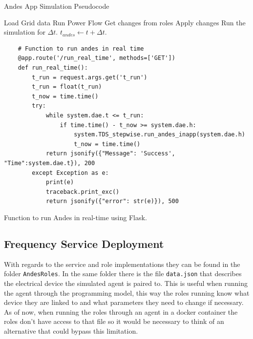 \documentclass{article}
\begin{document}
\begin{algorithm}
    \caption{Andes App Simulation Pseudocode}
    \begin{algorithmic}[1]
        \State Load Grid data
        \State Run Power Flow 
            \State Get changes from roles
            \State Apply changes
            \State Run the simulation for $\Delta t$.
            \State $t_{andes} \gets t + \Delta t$.
        \EndWhile
    \end{algorithmic}
\end{algorithm}

\begin{listing}[H]
    \begin{verbatim}
    # Function to run andes in real time
    @app.route('/run_real_time', methods=['GET'])
    def run_real_time():
        t_run = request.args.get('t_run')
        t_run = float(t_run)
        t_now = time.time()
        try:
            while system.dae.t <= t_run:
                if time.time() - t_now >= system.dae.h: 
                    system.TDS_stepwise.run_andes_inapp(system.dae.h)
                    t_now = time.time()
            return jsonify({"Message": 'Success', "Time":system.dae.t}), 200
        except Exception as e:
            print(e)
            traceback.print_exc()
            return jsonify({"error": str(e)}), 500
    \end{verbatim}
    \caption{Function to run Andes in real-time using Flask.}
    \label{code:andes_real_time}
    \end{listing}

\subsection{Frequency Service Deployment}

With regards to the service and role implementations they can be found in the folder \texttt{AndesRoles}. In the same folder there is the file \texttt{data.json} that describes the electrical device the simulated agent is paired to. This is useful when running the agent through the programming model, this way the roles running know what device they are linked to and what parameters they need to change if necessary. As of now, when running the roles through an agent in a docker container the roles don't have access to that file so it would be necessary to think of an alternative that could bypass this limitation.  
\end{document}
